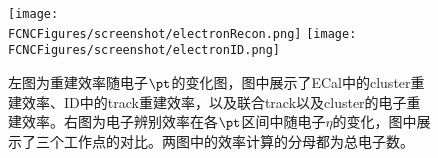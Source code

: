 \begin{figure}[htb]
\centering
\texttt{[image: \\FCNCFigures/screenshot/electronRecon.png]}
\texttt{[image: \\FCNCFigures/screenshot/electronID.png]}
\caption{左图为重建效率随电子$\pt$的变化图，图中展示了ECal中的cluster重建效率、ID中的track重建效率，以及联合track以及cluster的电子重建效率。右图为电子辨别效率在各$\pt$区间中随电子$\eta$的变化，图中展示了三个工作点的对比。两图中的效率计算的分母都为总电子数。}
\label{fig:electronRecon}
\end{figure}